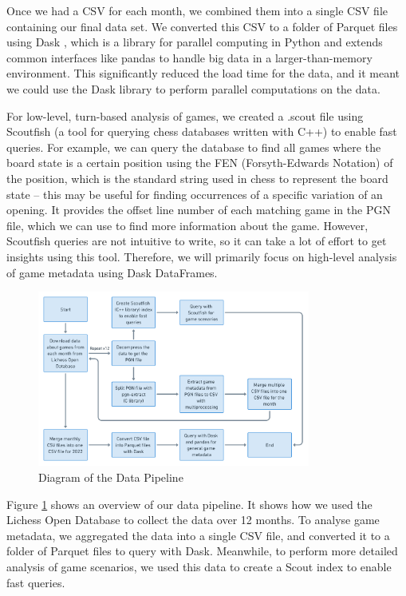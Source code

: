 \documentclass[a4paper, 11pt]{article}
\begin{document}
Once we had a CSV for each month, we combined them into a single CSV file containing our final data set. We converted this CSV to a folder of Parquet files using Dask \cite{dask}, which is a library for parallel computing in Python and extends common interfaces like pandas \cite{pandas} to handle big data in a larger-than-memory environment. This significantly reduced the load time for the data, and it meant we could use the Dask library to perform parallel computations on the data.

For low-level, turn-based analysis of games, we created a .scout file using Scoutfish (a tool for querying chess databases written with C++) \cite{scoutfish} to enable fast queries. For example, we can query the database to find all games where the board state is a certain position using the FEN (Forsyth-Edwards Notation) of the position, which is the standard string used in chess to represent the board state -- this may be useful for finding occurrences of a specific variation of an opening. It provides the offset line number of each matching game in the PGN file, which we can use to find more information about the game. However, Scoutfish queries are not intuitive to write, so it can take a lot of effort to get insights using this tool. Therefore, we will primarily focus on high-level analysis of game metadata using Dask DataFrames.

\begin{figure}[H]
    \centering
    \caption{Diagram of the Data Pipeline}
    \label{fig:dataPipeline}
    \includegraphics[width=0.8\textwidth]{Data Pipeline.png}
\end{figure}

Figure \ref{fig:dataPipeline} shows an overview of our data pipeline. It shows how we used the Lichess Open Database to collect the data over 12 months. To analyse game metadata, we aggregated the data into a single CSV file, and converted it to a folder of Parquet files to query with Dask. Meanwhile, to perform more detailed analysis of game scenarios, we used this data to create a Scout index to enable fast queries.
\end{document}
